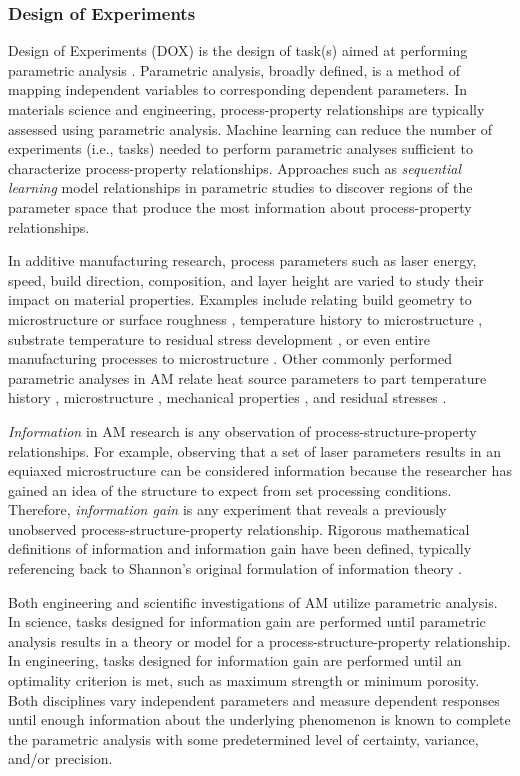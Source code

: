 \subsubsection{Design of Experiments}
Design of Experiments (DOX) is the design of task(s) aimed at performing parametric analysis \cite{Dox2014}. Parametric analysis, broadly defined, is a method of mapping independent variables to corresponding dependent parameters. In materials science and engineering, process-property relationships are typically assessed using parametric analysis. Machine learning can reduce the number of experiments (i.e., tasks) needed to perform parametric analyses sufficient to characterize process-property relationships. Approaches such as \textit{sequential learning} model relationships in parametric studies to discover regions of the parameter space that produce the most information about process-property relationships. 

 In additive manufacturing research, process parameters such as laser energy, speed, build direction, composition, and layer height are varied to study their impact on material properties. Examples include relating build geometry to microstructure or surface roughness \cite{Antonysamy2013, Strano2013}, temperature history to microstructure \cite{Bontha2009, Nie2014}, substrate temperature to residual stress development \cite{Chen2016, Brice2018}, or even entire manufacturing processes to microstructure \cite{Baufeld2011}. Other commonly performed parametric analyses in AM relate heat source parameters to part temperature history \cite{Bontha2006, Li2014}, microstructure \cite{Cherry2015, Jia2014}, mechanical properties \cite{Delgado2012, Khorasani2018}, and residual stresses \cite{Wu2014, Denlinger2015}.

\textit{Information} in AM research is any observation of process-structure-property relationships. For example, observing that a set of laser parameters results in an equiaxed microstructure can be considered information because the researcher has gained an idea of the structure to expect from set processing conditions. Therefore, \textit{information gain} is any experiment that reveals a previously unobserved process-structure-property relationship. Rigorous mathematical definitions of information and information gain have been defined, typically referencing back to Shannon's original formulation of information theory \cite{Shannon1948}.

Both engineering and scientific investigations of AM utilize parametric analysis. In science, tasks designed for information gain are performed until parametric analysis results in a theory or model for a process-structure-property relationship. In engineering, tasks designed for information gain are performed until an optimality criterion is met, such as maximum strength or minimum porosity. Both disciplines vary independent parameters and measure dependent responses until enough information about the underlying phenomenon is known to complete the parametric analysis with some predetermined level of certainty, variance, and/or precision. 

